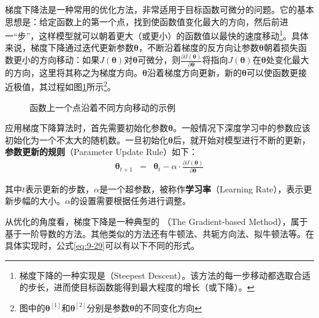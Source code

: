 \parinterval 梯度下降法是一种常用的优化方法，非常适用于目标函数可微分的问题。它的基本思想是：给定函数上的第一个点，找到使函数值变化最大的方向，然后前进一“步”，这样模型就可以朝着更大（或更小）的函数值以最快的速度移动\footnote{梯度下降的一种实现是{\scriptsize{}}（Steepest Descent）。该方法的每一步移动都选取合适的步长，进而使目标函数能得到最大程度的增长（或下降）。}。具体来说，梯度下降通过迭代更新参数$ {\bm \theta} $，不断沿着梯度的反方向让参数$ \bm \theta $朝着损失函数更小的方向移动：如果$ J({\bm \theta}) $对$ \bm \theta $可微分，则$ \frac{\partial J({\bm \theta})}{\partial {\bm \theta}} $将指向$ J({\bm \theta}) $在$ {\bm \theta} $处变化最大的方向，这里将其称之为梯度方向。${\bm \theta}$沿着梯度方向更新，新的${\bm \theta}$可以使函数更接近极值，其过程如图\ref{fig:9-43}所示\footnote{图中的${\bm \theta}^{[1]}$和${\bm \theta}^{[2]}$分别是参数$\bm \theta$的不同变化方向}。

\begin{figure}[htp]
\centering

\caption{函数上一个点沿着不同方向移动的示例}
\label{fig:9-43}
\end{figure}

\parinterval 应用梯度下降算法时，首先需要初始化参数${\bm \theta}$。一般情况下深度学习中的参数应该初始化为一个不太大的随机数。一旦初始化${\bm \theta}$后，就开始对模型进行不断的更新，{\small\sffamily\bfseries{参数更新的规则}}（Parameter Update Rule）如下：
\begin{eqnarray}
{\bm \theta}_{t+1}&=&{\bm \theta}_{t}-\alpha \cdot \frac{\partial J({\bm \theta})}{\partial {\bm \theta}}
\label{eq:9-29}
\end{eqnarray}

\noindent 其中$t $表示更新的步数，$ \alpha $是一个超参数，被称作{\small\sffamily\bfseries{学习率}}（Learning Rate），表示更新步幅的大小。$ \alpha $的设置需要根据任务进行调整。

\parinterval 从优化的角度看，梯度下降是一种典型的 {\small{}}（The Gradient-based Method），属于基于一阶导数的方法。其他类似的方法还有牛顿法、共轭方向法、拟牛顿法等。在具体实现时，公式\eqref{eq:9-29}可以有以下不同的形式。\\

%

